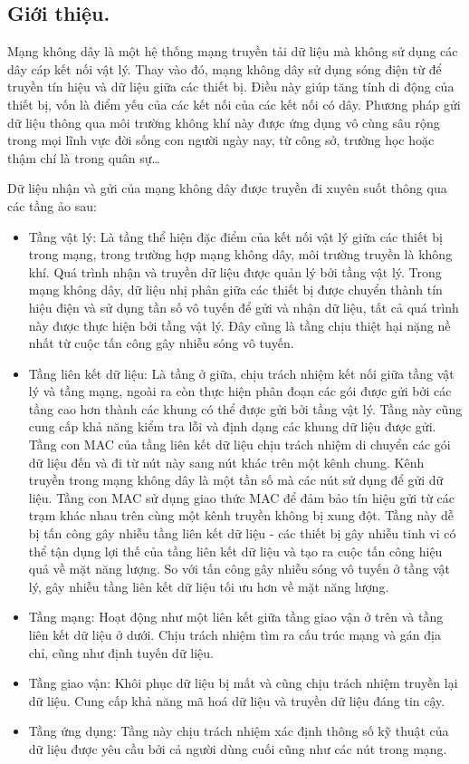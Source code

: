 \documentclass{uetgraduation}
\begin{document}
\subsection{Giới thiệu.}
Mạng không dây là một hệ thống mạng truyền tải dữ liệu mà không sử dụng các dây cáp kết nối vật lý. Thay vào đó, mạng không dây sử dụng sóng
điện từ để truyền tín hiệu và dữ liệu giữa các thiết bị. Điều này giúp tăng tính di động của thiết bị, vốn là điểm yếu của các kết nối của các
kết nối có dây. Phương pháp gửi dữ liệu thông qua môi trường không khí này được ứng dụng vô cùng sâu rộng trong mọi lĩnh vực đời sống con người
ngày nay, từ công sở, trường học hoặc thậm chí là trong quân sự\dots

Dữ liệu nhận và gửi của mạng không dây được truyền đi xuyên suốt thông qua các tầng ảo sau:
\begin{itemize}
    \item Tầng vật lý: Là tầng thể hiện đặc điểm của kết nối vật lý giữa các thiết bị trong mạng, trong trường hợp mạng không dây, môi trường truyền
    là không khí. Quá trình nhận và truyền dữ liệu được quản lý bởi tầng vật lý. Trong mạng không dây, dữ liệu nhị phân giữa các thiết bị được chuyển
    thành tín hiệu điện và sử dụng tần số vô tuyến để gửi và nhận dữ liệu, tất cả quá trình này được thực hiện bởi tầng vật lý. Đây cũng là tầng chịu
    thiệt hại nặng nề nhất từ cuộc tấn công gây nhiễu sóng vô tuyến.
    \item Tầng liên kết dữ liệu: Là tầng ở giữa, chịu trách nhiệm kết nối giữa tầng vật lý và tầng mạng, ngoài ra còn thực hiện phân đoạn các gói được
    gửi bởi các tầng cao hơn thành các khung có thể được gửi bởi tầng vật lý. Tầng này cũng cung cấp khả năng kiểm tra lỗi và định dạng các khung dữ liệu
    được gửi. Tầng con MAC của tầng liên kết dữ liệu chịu trách nhiệm di chuyển các gói dữ liệu đến và đi từ nút này sang nút khác trên một kênh chung.
    Kênh truyền trong mạng không dây là một tần số mà các nút sử dụng để gửi dữ liệu. Tầng con MAC sử dụng giao thức MAC để đảm bảo tín hiệu gửi từ các
    trạm khác nhau trên cùng một kênh truyền không bị xung đột. Tầng này dễ bị tấn công gây nhiễu tầng liên kết dữ liệu - các thiết bị gây nhiễu tinh vi
    có thể tận dụng lợi thế của tầng liên kết dữ liệu và tạo ra cuộc tấn công hiệu quả về mặt năng lượng. So với tấn công gây nhiễu sóng vô tuyến ở tầng
    vật lý, gây nhiễu tầng liên kết dữ liệu tối ưu hơn về mặt năng lượng.
    \item Tầng mạng: Hoạt động như một liên kết giữa tầng giao vận ở trên và tầng liên kết dữ liệu ở dưới. Chịu trách nhiệm tìm ra cấu trúc mạng và gán địa
    chỉ, cũng như định tuyến dữ liệu.
    \item Tầng giao vận: Khôi phục dữ liệu bị mất và cũng chịu trách nhiệm truyền lại dữ liệu. Cung cấp khả năng mã hoá dữ liệu và truyền dữ liệu đáng tin cậy.
    \item Tầng ứng dụng: Tầng này chịu trách nhiệm xác định thông số kỹ thuật của dữ liệu được yêu cầu bởi cả người dùng cuối cũng như các nút trong mạng. 
\end{itemize}
\end{document}

